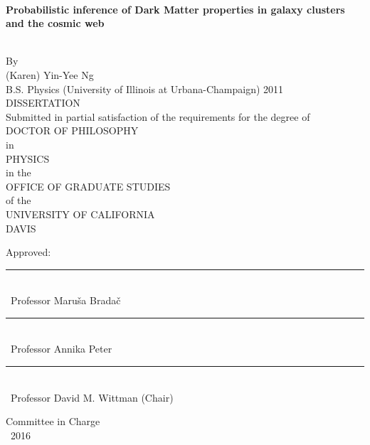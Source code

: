 \singlespacing

~\vspace{-0.5in} %
\begin{center}

  \begin{large}
    {\bf Probabilistic inference of Dark Matter properties in galaxy clusters
		and the cosmic web}
  \end{large}\\\n
  By\\\n
  {\sc (Karen) Yin-Yee Ng}\\
  B.S. Physics (University of Illinois at Urbana-Champaign) 2011\\
  DISSERTATION\\\n
  Submitted in partial satisfaction of the requirements for the degree of\\\n
  DOCTOR OF PHILOSOPHY\\\n
  in\\\n
  PHYSICS\\\n
  in the\\\n
  OFFICE OF GRADUATE STUDIES\\\n
  of the\\\n
  UNIVERSITY OF CALIFORNIA\\\n
  DAVIS\\\n\n
  
  Approved:\\\n\n
  
  \rule{4in}{1pt}\\
  ~Professor Maru{\v s}a Brada{\v c}\\ \n\n

  \rule{4in}{1pt}\\
  ~Professor Annika Peter\\\n\n


  \rule{4in}{1pt}\\
  ~Professor David M. Wittman (Chair)\\ \n\n

  \vfill
  
  Committee in Charge\\
  ~2016
  
\end{center}
